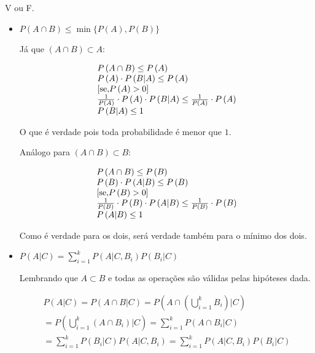 \item V ou F.

\begin{itemize}
  \item $\displaystyle P\left( {A \cap B} \right) \le \min \{ P(A),P(B)\} $

  Já que $\left( A \cap B \right) \subset A$:

  \[\begin{array}{l}
  \displaystyle
  P\left( {A \cap B} \right) \le P\left( A \right)\\
  P\left( A \right) \cdot P\left( {B|A} \right) \le P\left( A \right)\\
  \left[ {{\rm{se}}{\rm{, }}P\left( A \right) > 0} \right]\\
  \frac{1}{{P\left( A \right)}} \cdot P\left( A \right) \cdot P\left( {B|A} \right) \le \frac{1}{{P\left( A \right)}} \cdot P\left( A \right)\\
  P\left( {B|A} \right) \le 1
  \end{array}\]

  O que é verdade pois toda probabilidade é menor que $1$.

  Análogo para $\left( A \cap B \right) \subset B$:

  \[\begin{array}{l}
  P\left( {A \cap B} \right) \le P\left( B \right)\\
  P\left( B \right) \cdot P\left( {A|B} \right) \le P\left( B \right)\\
  \left[ {{\rm{se}}{\rm{, }}P\left( B \right) > 0} \right]\\
  \frac{1}{{P\left( B \right)}} \cdot P\left( B \right) \cdot P\left( {A|B} \right) \le \frac{1}{{P\left( B \right)}} \cdot P\left( B \right)\\
  P\left( {A|B} \right) \le 1
  \end{array}\]

  Como é verdade para os dois, será verdade também para o mínimo dos dois.

  \item $\displaystyle P\left( {A|C} \right) = \sum\limits_{i = 1}^k {P\left( {A|C,{B_i}} \right)P\left( {{B_i}|C} \right)} $

  Lembrando que $A \subset B$ e todas as operações são válidas pelas hipóteses dada.

  \[\begin{array}{l}
  \displaystyle
  P\left( {A|C} \right) = P\left( {A \cap B|C} \right) = P\left( {A \cap \left( {\bigcup\limits_{i = 1}^k {{B_i}} } \right)|C} \right)\\
  = P\left( {\bigcup\limits_{i = 1}^k {\left( {A \cap {B_i}} \right)} |C} \right) = \sum\limits_{i = 1}^k {P\left( {A \cap {B_i}|C} \right)} \\
  = \sum\limits_{i = 1}^k {P\left( {{B_i}|C} \right)P\left( {A|C,{B_i}} \right)}  = \sum\limits_{i = 1}^k {P\left( {A|C,{B_i}} \right)P\left( {{B_i}|C} \right)}
  \end{array}\]


\end{itemize}
